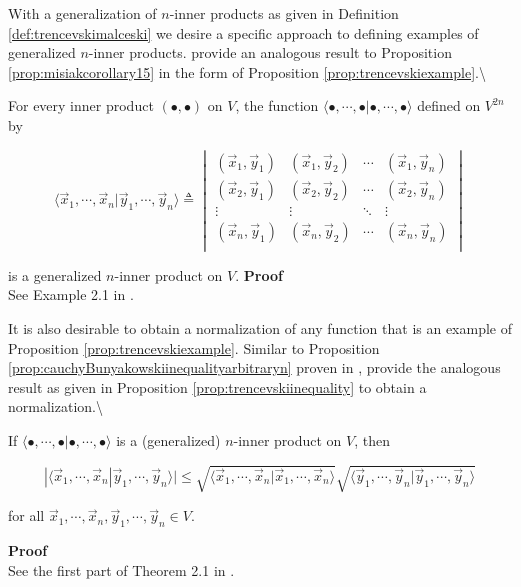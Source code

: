 \documentclass[
  letterpaper,
  DIV=11,
  numbers=noendperiod]{scrreprt}
\begin{document}
With a generalization of \(n\)-inner products as given in Definition
\ref{def:trencevskimalceski} we desire a specific approach to defining
examples of generalized \(n\)-inner products. \cite{trencevski2006}
provide an analogous result to Proposition \ref{prop:misiakcorollary15}
in the form of Proposition \ref{prop:trencevskiexample}.\textbackslash{}

\begin{Proposition}[myproposition=\cite{trencevski2006}, label=prop:trencevskiexample]

For every inner product $(\bullet, \bullet)$ on $V$, the function $\langle \bullet, \cdots, \bullet| \bullet, \cdots, \bullet \rangle$ defined on $V^{2n}$ by

$$\langle \vec{x}_1, \cdots, \vec{x}_n | \vec{y}_1, \cdots, \vec{y}_n  \rangle \triangleq \begin{vmatrix}
( \vec{x}_1, \vec{y}_1 ) & ( \vec{x}_1, \vec{y}_2 ) & \cdots & ( \vec{x}_1, \vec{y}_{n} ) \\ 
( \vec{x}_2, \vec{y}_1 ) & ( \vec{x}_2, \vec{y}_2 ) & \cdots & ( \vec{x}_2, \vec{y}_{n} ) \\ 
\vdots & \vdots & \ddots & \vdots \\
( \vec{x}_{n}, \vec{y}_1 ) & ( \vec{x}_{n}, \vec{y}_2 ) & \cdots & ( \vec{x}_{n}, \vec{y}_{n} ) \\
\end{vmatrix} $$

is a generalized $n$-inner product on $V$.
\tcbline
\textbf{Proof}\\
See Example 2.1 in \cite{trencevski2006}.
\end{Proposition}

It is also desirable to obtain a normalization of any function that is
an example of Proposition \ref{prop:trencevskiexample}. Similar to
Proposition \ref{prop:cauchyBunyakowskiinequalityarbitraryn} proven in
\cite{Misiak1989}, \cite{trencevski2006} provide the analogous result as
given in Proposition \ref{prop:trencevskiinequality} to obtain a
normalization.\textbackslash{}

\begin{Proposition}[myproposition=\cite{trencevski2006}, label=prop:trencevskiinequality]

If $\langle \bullet, \cdots, \bullet | \bullet, \cdots, \bullet \rangle$ is a (generalized) $n$-inner product on $V$, then

$$| \langle \vec{x}_1, \cdots, \vec{x}_n | \vec{y}_1, \cdots, \vec{y}_n \rangle |  \leq \sqrt{\langle \vec{x}_1, \cdots, \vec{x}_n | \vec{x}_1, \cdots, \vec{x}_n \rangle} \sqrt{\langle \vec{y}_1, \cdots, \vec{y}_n | \vec{y}_1, \cdots, \vec{y}_n \rangle}$$

for all $\vec{x}_1, \cdots, \vec{x}_n,  \vec{y}_1, \cdots, \vec{y}_n \in V$.

\tcbline
\textbf{Proof}\\
See the first part of Theorem 2.1 in \cite{trencevski2006}.
\end{Proposition}
\end{document}
